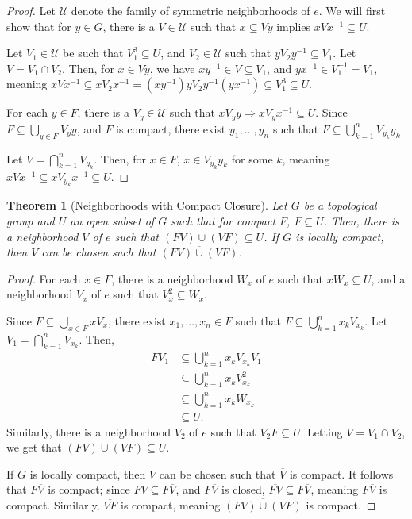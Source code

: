 \documentclass[12pt]{extarticle}
\theoremstyle{plain}
\newtheorem*{theorem}{Theorem}
\theoremstyle{definition}
\theoremstyle{note}
\renewcommand{\newline}{\hfill\break}
\begin{document}
\begin{proof}
  Let $\mathcal{U}$ denote the family of symmetric neighborhoods of $e$. We will first show that for $y\in G$, there is a $V\in \mathcal{U}$ such that $x\subseteq Vy$ implies $xVx^{-1}\subseteq U$.\newline

  Let $V_1\in \mathcal{U}$ be such that $V_1^{3}\subseteq U$, and $V_2\in \mathcal{U}$ such that $yV_2 y^{-1}\subseteq V_1$. Let $V = V_1 \cap V_2$. Then, for $x\in Vy$, we have $xy^{-1}\in V\subseteq V_1$, and $yx^{-1}\in V_1^{-1} = V_1$, meaning $xVx^{-1}\subseteq xV_2x^{-1} = \left(xy^{-1}\right) y V_2 y^{-1} \left(yx^{-1}\right) \subseteq V_1^{3}\subseteq U$.\newline

  For each $y\in F$, there is a $V_y\in \mathcal{U}$ such that $xV_y y \Rightarrow xV_y x^{-1}\subseteq U$. Since $F\subseteq \bigcup_{y\in F}V_y y$, and $F$ is compact, there exist $y_1,\dots,y_n$ such that $F\subseteq \bigcup_{k=1}^{n}V_{y_k}y_k$.\newline

  Let $V = \bigcap_{k=1}^{n}V_{y_k}$. Then, for $x\in F$, $x\in V_{y_k}y_k$ for some $k$, meaning $xVx^{-1}\subseteq xV_{y_k}x^{-1}\subseteq U$.
\end{proof}
\begin{theorem}[Neighborhoods with Compact Closure]
  Let $G$ be a topological group and $U$ an open subset of $G$ such that for compact $F$, $F\subseteq U$. Then, there is a neighborhood $V$ of $e$ such that $\left(FV\right) \cup \left(VF\right) \subseteq U$. If $G$ is locally compact, then $V$ can be chosen such that $\overline{\left(FV\right) \cup \left(VF\right)}$.
\end{theorem}
\begin{proof}
  For each $x\in F$, there is a neighborhood $W_x$ of $e$ such that $xW_x\subseteq U$, and a neighborhood $V_x$ of $e$ such that $V_x^2\subseteq W_x$.\newline

  Since $F \subseteq \bigcup_{x\in F}xV_x$, there exist $x_1,\dots,x_n\in F$ such that $F\subseteq \bigcup_{k=1}^{n}x_kV_{x_k}$. Let $V_1 = \bigcap_{k=1}^{n}V_{x_k}$. Then,
  \begin{align*}
    FV_1 &\subseteq \bigcup_{k=1}^{n}x_kV_{x_k}V_1\\
         &\subseteq \bigcup_{k=1}^{n} x_kV_{x_k}^2\\
         &\subseteq \bigcup_{k=1}^{n}x_kW_{x_k}\\
         &\subseteq U.
  \end{align*}
  Similarly, there is a neighborhood $V_2$ of $e$ such that $V_2F\subseteq U$. Letting $V = V_1\cap V_2$, we get that $\left(FV\right)\cup \left(VF\right)\subseteq U$.\newline

  If $G$ is locally compact, then $V$ can be chosen such that $\overline{V}$ is compact. It follows that $F\overline{V}$ is compact; since $FV \subseteq F\overline{V}$, and $F\overline{V}$ is closed, $\overline{FV}\subseteq F\overline{V}$, meaning $F\overline{V}$ is compact. Similarly, $\overline{VF}$ is compact, meaning $\overline{\left(FV\right) \cup \left(VF\right)}$ is compact.
\end{proof}
\end{document}
